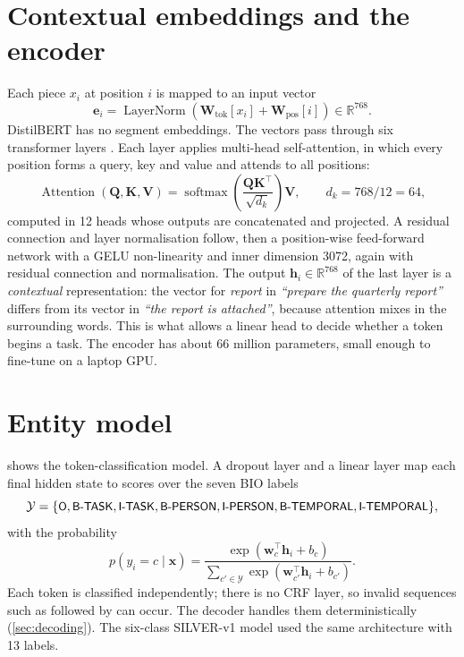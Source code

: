 \section{Contextual embeddings and the encoder}
Each piece $x_i$ at position $i$ is mapped to an input vector
\begin{equation}
\mathbf{e}_i = \operatorname{LayerNorm}\!\left(\mathbf{W}_{\text{tok}}[x_i] + \mathbf{W}_{\text{pos}}[i]\right) \in \mathbb{R}^{768}.
\end{equation}
DistilBERT has no segment embeddings. The vectors pass through six transformer layers \citep{vaswani2017attention}. Each layer applies multi-head self-attention, in which every position forms a query, key and value and attends to all positions:
\begin{equation}
\operatorname{Attention}(\mathbf{Q},\mathbf{K},\mathbf{V}) = \operatorname{softmax}\!\left(\frac{\mathbf{Q}\mathbf{K}^{\top}}{\sqrt{d_k}}\right)\mathbf{V}, \qquad d_k = 768/12 = 64,
\end{equation}
computed in 12 heads whose outputs are concatenated and projected. A residual connection and layer normalisation follow, then a position-wise feed-forward network with a GELU non-linearity and inner dimension 3072, again with residual connection and normalisation. The output $\mathbf{h}_i\in\mathbb{R}^{768}$ of the last layer is a \emph{contextual} representation: the vector for \emph{report} in \emph{``prepare the quarterly report''} differs from its vector in \emph{``the report is attached''}, because attention mixes in the surrounding words. This is what allows a linear head to decide whether a token begins a task. The encoder has about 66 million parameters, small enough to fine-tune on a laptop GPU.

\section{Entity model}
 shows the token-classification model. A dropout layer and a linear layer map each final hidden state to scores over the seven BIO labels
\[
\mathcal{Y}=\{\lab{O},\lab{B-TASK},\lab{I-TASK},\lab{B-PERSON},\lab{I-PERSON},\lab{B-TEMPORAL},\lab{I-TEMPORAL}\},
\]
with the probability
\begin{equation}
p(y_i = c \mid \mathbf{x}) = \frac{\exp(\mathbf{w}_c^{\top}\mathbf{h}_i + b_c)}{\sum_{c'\in\mathcal{Y}}\exp(\mathbf{w}_{c'}^{\top}\mathbf{h}_i + b_{c'})}.
\end{equation}
Each token is classified independently; there is no CRF layer, so invalid sequences such as  followed by  can occur. The decoder handles them deterministically (\cref{sec:decoding}). The six-class SILVER-v1 model used the same architecture with 13 labels.


